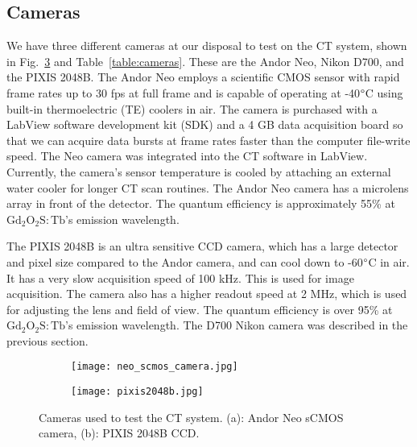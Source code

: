 \subsection{Cameras}
We have three different cameras at our disposal to test on the CT system, shown in Fig.~\ref{fig:cameras} and Table~\ref{table:cameras}.  These are the Andor Neo, Nikon D700, and the PIXIS 2048B.  The Andor Neo employs a scientific CMOS sensor with rapid frame rates up to 30 fps at full frame and is capable of operating at -40$\degree$C using built-in thermoelectric (TE) coolers in air.  The camera is purchased with a LabView software development kit (SDK) and a 4 GB data acquisition board so that we can acquire data bursts at frame rates faster than the computer file-write speed.  The Neo camera was integrated into the CT software in LabView.  Currently, the camera's sensor temperature is cooled by attaching an external water cooler for longer CT scan routines.  The Andor Neo camera has a microlens array in front of the detector.  The quantum efficiency is approximately 55\% at $\mathrm{Gd_2O_2S:Tb}$'s emission wavelength.

The PIXIS 2048B is an ultra sensitive CCD camera, which has a large detector and pixel size compared to the Andor camera, and can cool down to -60$\degree$C in air.  It has a very slow acquisition speed of 100 kHz.  This is used for image acquisition.  The camera also has a higher readout speed at 2 MHz, which is used for adjusting the lens and field of view.  The quantum efficiency is over 95\% at $\mathrm{Gd_2O_2S:Tb}$'s emission wavelength. The D700 Nikon camera was described in the previous section.
%
\begin{figure}
	\begin{subfigure}[b]{0.45\linewidth}
	\centering
	\texttt{[image: neo\_scmos\_camera.jpg]}
	\caption{}
	\label{fig:neo}
	\end{subfigure}
\hspace{1 cm}	
	\begin{subfigure}[b]{0.45\linewidth}
	\centering
	\texttt{[image: pixis2048b.jpg]}
	\caption{}
	\label{fig:pixis}
	\end{subfigure}
\caption{Cameras used to test the CT system. (a): Andor Neo sCMOS camera, (b): PIXIS 2048B CCD.}
\label{fig:cameras}
\end{figure}


